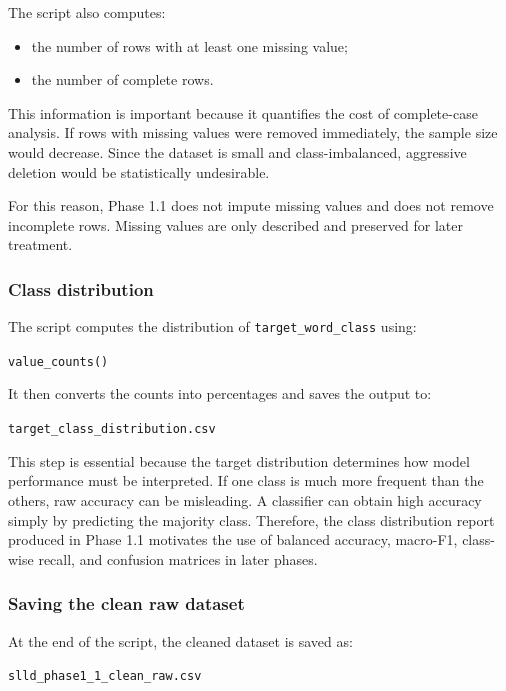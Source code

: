 \documentclass{ipgpmaster}
\begin{document}
The script also computes:

\begin{itemize}
    \item the number of rows with at least one missing value;
    \item the number of complete rows.
\end{itemize}

This information is important because it quantifies the cost of complete-case analysis. If rows with missing values were removed immediately, the sample size would decrease. Since the dataset is small and class-imbalanced, aggressive deletion would be statistically undesirable.

For this reason, Phase 1.1 does not impute missing values and does not remove incomplete rows. Missing values are only described and preserved for later treatment.

\subsubsection{Class distribution}

The script computes the distribution of \texttt{target\_word\_class} using:

\begin{center}
\texttt{value\_counts()}
\end{center}

It then converts the counts into percentages and saves the output to:

\begin{center}
\texttt{target\_class\_distribution.csv}
\end{center}

This step is essential because the target distribution determines how model performance must be interpreted. If one class is much more frequent than the others, raw accuracy can be misleading. A classifier can obtain high accuracy simply by predicting the majority class. Therefore, the class distribution report produced in Phase 1.1 motivates the use of balanced accuracy, macro-F1, class-wise recall, and confusion matrices in later phases.

\subsubsection{Saving the clean raw dataset}

At the end of the script, the cleaned dataset is saved as:

\begin{center}
\texttt{slld\_phase1\_1\_clean\_raw.csv}
\end{center}
\end{document}
